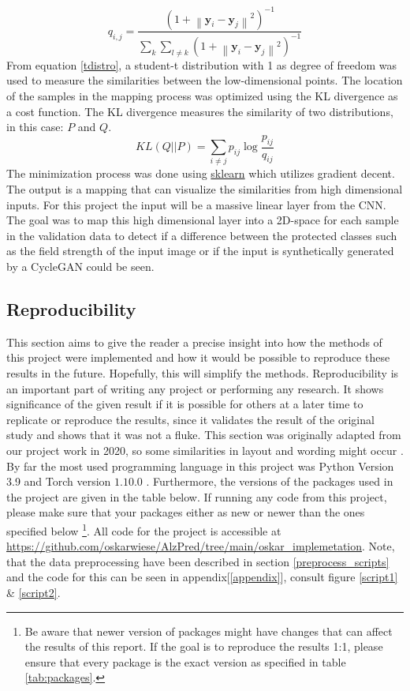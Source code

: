 \documentclass[11pt, fleqn, titlepage]{article}
\newcommand{\norm}[1]{\left\lVert#1\right\rVert}
\newcommand{\1}[1]{\mathds{1}\left[#1\right]}
\begin{document}
\begin{equation}\label{tdistro}
	q_{i,j} = \frac{(1 + \norm{\mathbf y_i - \mathbf y_j}^2)^{-1}}{\sum_k \sum_{l \neq k}(1 + \norm{\mathbf y_i - \mathbf y_j}^2)^{-1}}
\end{equation}
From equation \eqref{tdistro}, a student-t distribution with 1 as degree of freedom was used to measure the similarities between the low-dimensional points. 
The location of the samples in the mapping process was optimized using the KL divergence as a cost function. The KL divergence measures the similarity of two distributions, in this case: $ P $ and $ Q $. 
\begin{equation*}\label{key}
	KL(Q \vert \vert P) = \sum_{i \neq j} p_{ij} \log \frac{p_{ij}}{q_{ij}}
\end{equation*} 
The minimization process was done using \href{https://scikit-learn.org/stable/modules/generated/sklearn.manifold.TSNE.html}{sklearn} which utilizes gradient decent. The output is a mapping that can visualize the similarities from high dimensional inputs. For this project the input will be a massive linear layer from the CNN. The goal was to map this high dimensional layer into a 2D-space for each sample in the validation data to detect if a difference between the protected classes such as the field strength of the input image or if the input is synthetically generated by a CycleGAN could be seen.


\subsection{Reproducibility}\label{reproducibility}
This section aims to give the reader a precise insight into how the methods of this project were implemented and how it would be possible to reproduce these results in the future. Hopefully, this will simplify the methods. Reproducibility is an important part of writing any project or performing any research. It shows significance of the given result if it is possible for others at a later time to replicate or reproduce the results, since it validates the result of the original study and shows that it was not a fluke. This section was originally adapted from our project work in 2020, so some similarities in layout and wording might occur \cite{fagproject}. By far the most used programming language in this project was Python Version 3.9 and Torch version $ 1.10.0 $ \cite{python, pytorch}.
Furthermore, the versions of the packages used in the project are given in the table below. If running any code from this project, please make sure that your packages either as new or newer than the ones specified below \footnote{Be aware that newer version of packages might have changes that can affect the results of this report. If the goal is to reproduce the results 1:1, please ensure that every package is the exact version as specified in table \ref{tab:packages}.}. All code for the project is accessible at \url{https://github.com/oskarwiese/AlzPred/tree/main/oskar_implemetation}. Note, that the data preprocessing have been described in section \ref{preprocess_scripts} and the code for this can be seen in appendix[\ref{appendix}], consult figure \ref{script1} \& \ref{script2}. 
\end{document}
